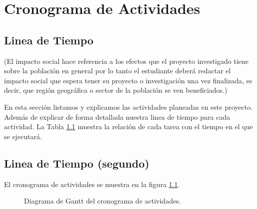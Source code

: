 \chapter{Cronograma de Actividades}

\section{Linea de Tiempo}
(El impacto social hace referencia a los efectos que el proyecto investigado tiene sobre la población en general por lo tanto el estudiante deberá redactar el impacto social que espera tener su proyecto o investigación una vez  finalizada, es decir, que región geográfica o sector de la población se ven beneficiados.)

En esta sección listamos y explicamos las actividades planeadas en este proyecto. Además de explicar de forma detallada nuestra linea de tiempo para cada actividad. La Tabla \ref{fig:cronograma} muestra la relación de cada tarea con el tiempo en el que se ejecutará.


\section{Linea de Tiempo (segundo)}
El cronograma de actividades se muestra en la figura \ref{fig:cronograma}. 

\begin{figure}[!htb]
\caption{Diagrama de Gantt del cronograma de actividades.}
  \label{fig:cronograma}
\end{figure}
